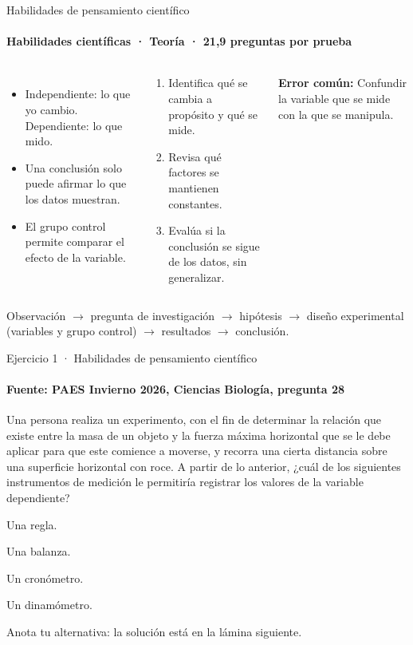 \documentclass[aspectratio=169,11pt]{beamer}
\newcommand{\alternativa}[2]{\begin{opcion}\tecla{#1}\hspace{0.6em}#2\end{opcion}}
\newlength{\ajustealto}
\newenvironment{ajustar}[1][0.74\textheight]
  {\setlength{\ajustealto}{#1}\begin{lrbox}{\ajustecaja}\begin{minipage}{\textwidth}}
  {\end{minipage}\end{lrbox}%
   \ifdim\dimexpr\ht\ajustecaja+\dp\ajustecaja\relax>\ajustealto
     \resizebox*{!}{\ajustealto}{\usebox{\ajustecaja}}\else\usebox{\ajustecaja}\fi}
\begin{document}
\begin{frame}{Habilidades de pensamiento científico}
\label{tema-cs-habilidades}
\framesubtitle{Habilidades científicas · Teoría · 21,9 preguntas por prueba}
\begin{ajustar}
\begin{columns}[T,onlytextwidth]
\begin{itemize}\footnotesize
\item Independiente: lo que yo cambio. Dependiente: lo que mido.
\item Una conclusión solo puede afirmar lo que los datos muestran.
\item El grupo control permite comparar el efecto de la variable.
\end{itemize}
\begin{cajaregla}\scriptsize \begin{enumerate}\item Identifica qué se cambia a propósito y qué se mide.\item Revisa qué factores se mantienen constantes.\item Evalúa si la conclusión se sigue de los datos, sin generalizar.\end{enumerate}\end{cajaregla}
\begin{notagris}\scriptsize \textbf{Error común:} Confundir la variable que se mide con la que se manipula.\end{notagris}
\end{columns}
\begin{cajaclave}\footnotesize
Observación $\rightarrow$ pregunta de investigación $\rightarrow$ hipótesis $\rightarrow$ diseño experimental (variables y grupo control) $\rightarrow$ resultados $\rightarrow$ conclusión.
\end{cajaclave}
\end{ajustar}
\end{frame}

\begin{frame}{Ejercicio 1 · Habilidades de pensamiento científico}
\framesubtitle{Fuente: PAES Invierno 2026, Ciencias Biología, pregunta 28}
\begin{ajustar}[0.7\textheight]
{\small Una persona realiza un experimento, con el fin de determinar la relación que existe entre la masa de un objeto y la fuerza máxima horizontal que se le debe aplicar para que este comience a moverse, y recorra una cierta distancia sobre una superficie horizontal con roce. A partir de lo anterior, ¿cuál de los siguientes instrumentos de medición le permitiría registrar los valores de la variable dependiente?}
\vspace{0.4em}
\alternativa{A}{Una regla.}
\alternativa{B}{Una balanza.}
\alternativa{C}{Un cronómetro.}
\alternativa{D}{Un dinamómetro.}
\end{ajustar}
\vfill{\tiny\color{zinc500}\hfill Anota tu alternativa: la solución está en la lámina siguiente.}
\end{frame}
\end{document}
